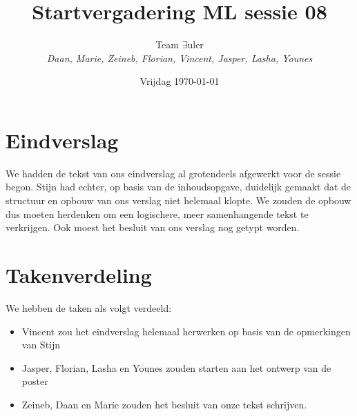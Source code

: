 \documentclass{article}
\title{Startvergadering ML sessie 08}
\author{Team $\exists$uler\\
	\textit{Daan, Marie, Zeineb, Florian, Vincent, Jasper, Lasha, Younes}}
\date{Vrijdag \today}
\begin{document}
	
	\maketitle
	
	\section*{Eindverslag}
	
	We hadden de tekst van ons eindverslag al grotendeels afgewerkt voor de sessie begon. Stijn had echter, op basis van de inhoudsopgave, duidelijk gemaakt dat de structuur en opbouw van ons verslag niet helemaal klopte. We zouden de opbouw dus moeten herdenken om een logischere, meer samenhangende tekst te verkrijgen. Ook moest het besluit van ons verslag nog getypt worden.
	
	\section*{Takenverdeling}
	
	We hebben de taken als volgt verdeeld:
	
	\begin{itemize}
		\item Vincent zou het eindverslag helemaal herwerken op basis van de opmerkingen van Stijn
		\item Jasper, Florian, Lasha en Younes zouden starten aan het ontwerp van de poster
		\item Zeineb, Daan en Marie zouden het besluit van onze tekst schrijven.
	\end{itemize}
	
\end{document}

